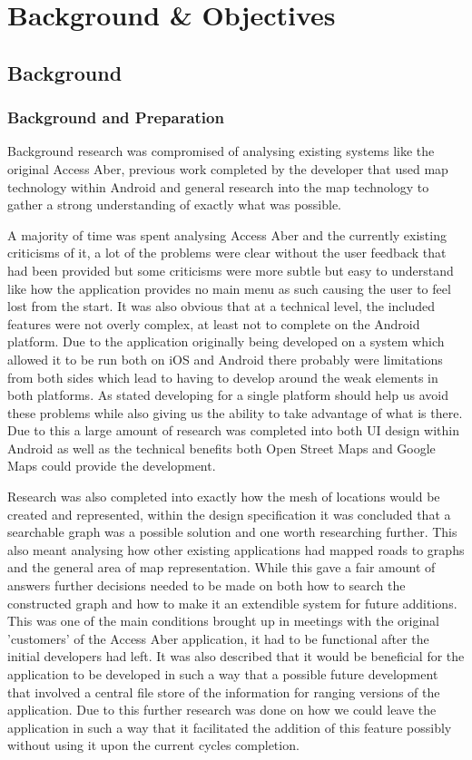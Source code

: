\chapter{Background \& Objectives}

\section{Background}
\subsection{Background and Preparation}
Background research was compromised of analysing existing systems like the original Access Aber\cite{aa}, previous work completed by the developer that used map technology within Android and general research into the map technology to gather a strong understanding of exactly what was possible.

A majority of time was spent analysing Access Aber and the currently existing criticisms of it, a lot of the problems were clear without the user feedback that had been provided but some criticisms were more subtle but easy to understand like how the application provides no main menu as such causing the user to feel lost from the start. It was also obvious that at a technical level, the included features were not overly complex, at least not to complete on the Android platform. Due to the application originally being developed on a system which allowed it to be run both on iOS and Android there probably were limitations from both sides which lead to having to develop around the weak elements in both platforms. As stated developing for a single platform should help us avoid these problems while also giving us the ability to take advantage of what is there. Due to this a large amount of research was completed into both UI design within Android as well as the technical benefits both Open Street Maps\cite{osm} and Google Maps\cite{gm} could provide the development. 

Research was also completed into exactly how the mesh of locations would be created and represented\cite{pf}, within the design specification it was concluded that a searchable graph was a possible solution and one worth researching further. This also meant analysing how other existing applications had mapped roads to graphs and the general area of map representation\cite{mr}. While this gave a fair amount of answers further decisions needed to be made on both how to search the constructed graph and how to make it an extendible system for future additions. This was one of the main conditions brought up in meetings with the original 'customers' of the Access Aber application, it had to be functional after the initial developers had left. It was also described that it would be beneficial for the application to be developed in such a way that a possible future development that involved a central file store of the information for ranging versions of the application. Due to this further research was done on how we could leave the application in such a way that it facilitated the addition of this feature possibly without using it upon the current cycles completion. 

